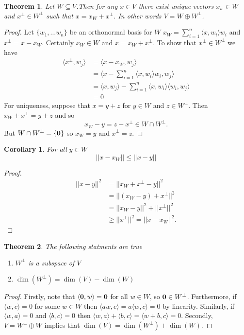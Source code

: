 \documentclass[oneside, 12pt]{book}
\newtheorem{thm}{Theorem}[section]
\newtheorem{cor}{Corollary}[section]
\theoremstyle{definition}
\begin{document}
\begin{thm}
\label{thm_orthodecomp}
  Let $W \subseteq V$.Then for any $x \in V$ there exist unique vectors $x_{w} \in W$ and $x^{\perp} \in W^{\perp}$ such that $x=x_{W}+x^{\perp}$. In other words $V=W \oplus W^{\perp}$.
\end{thm}
\begin{proof}
  Let $\{w_{1}, \dots w_{n}\}$ be an orthonormal basis for $W$ $x_{W}=\sum_{i=1}^{n}\langle x, w_{i} \rangle w_{i}$ and $x^{\perp}=x-x_{W}$. Certainly $x_{W} \in W$ and $x=x_{W}+x^{\perp}$. To show that $x^{\perp} \in W^{\perp}$ we have
  \begin{align}
    \langle x^{\perp},w_{j}\rangle &= \langle x-x_{W}, w_{j} \rangle \\
                   &= \langle x- \sum_{i=1}^{n} \langle x, w_{i} \rangle w_{i}, w_{j} \rangle \\
                   &= \langle x, w_{j} \rangle - \sum_{i=1}^{n}\langle x, w_{i} \rangle \langle w_{i}, w_{j} \rangle \\
    &= 0
  \end{align}
  For uniqueness, suppose that $x=y+z$ for $y \in W$ and $z \in W^{\perp}$. Then $x_{W}+x^{\perp}=y+z$ and so \[x_{W}-y=z-x^{\perp} \in W \cap W^{\perp}.\]
  But $W \cap W^{\perp}=\{\bold{0}\}$ so $x_{W}=y$ and $x^{\perp}=z$.
\end{proof}
\begin{cor}
  \label{cor_min}
For all $y \in W$ \[||x-x_{W}||\leq ||x-y||\]
\end{cor}
\begin{proof}
\begin{align}
  ||x-y||^{2} &= ||x_{W}+x^{\perp}-y||^{2} \\
              &=||(x_{W}-y)+x^{\perp}||^{2} \\
              &= ||x_{W}-y||^{2}+||x^{\perp}||^{2} \\
              &\geq ||x^{\perp}||^{2} = ||x-x_{W}||^{2}.
\end{align}
\end{proof}
\begin{thm}
The following statments are true
\begin{enumerate}
  \item $W^{\perp}$ is a subspace of $V$
  \item $\dim(W^{\perp})=\dim(V)-\dim(W)$
\end{enumerate}
\end{thm}
\begin{proof}
  Firstly, note that $ \langle \bold{0}, w\rangle=\bold{0}$ for all $w \in W$, so $\bold{0} \in W^{\perp}$. Furthermore, if $\langle w, c\rangle=0$ for some $w \in W$ then
  $\langle aw, c \rangle = a \langle w, c \rangle =0 $ by linearity. Similarly, if $\langle w, a \rangle=0  $ and $\langle b, c \rangle=0  $ then $\langle w, a \rangle+ \langle b, c \rangle= \langle w+b, c \rangle =0$. Secondly, $V= W^{\perp} \oplus W$ implies that $\dim(V)=\dim(W^{\perp})+\dim(W)$.
\end{proof}
\end{document}
